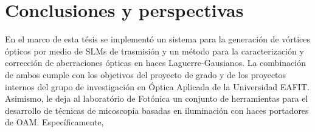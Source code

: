 


\chapter{Conclusiones y perspectivas}
\label{cha:Conclusiones}

En el marco de esta tésis se implementó un sistema para la generación
de vórtices ópticos por medio de SLMs de trasmisión y un método para
la caracterización y corrección de aberraciones ópticas en haces Laguerre-Gausianos. 
La combinación de ambos cumple con los objetivos del proyecto de grado
y de los proyectos internos del grupo de investigación en Óptica
Aplicada de la Universidad EAFIT. Asimismo, le deja al laboratório de
Fotónica un conjunto de herramientas para el
desarrollo de técnicas de micoscopía basadas en iluminación con haces
portadores de OAM. 
Específicamente, 
